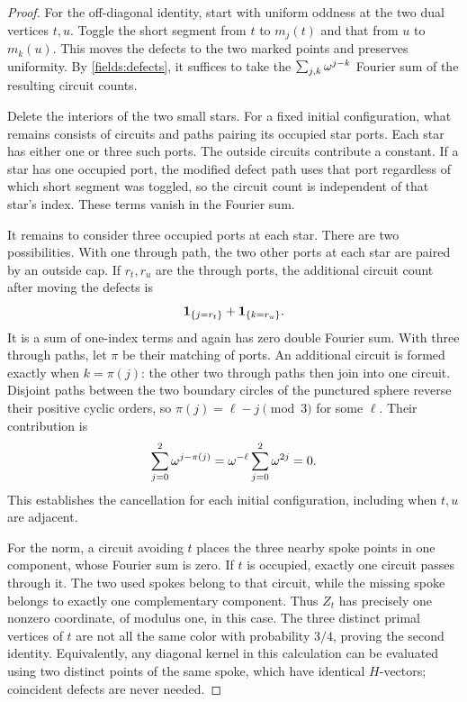 \begin{proof}
For the off-diagonal identity, start with uniform oddness at the two dual
vertices $t,u$.  Toggle the short segment from $t$ to $m_j(t)$ and that from
$u$ to $m_k(u)$.  This moves the defects to the two marked points and
preserves uniformity.  By \cref{fields:defects}, it suffices to take the
$\sum_{j,k}\omega^{j-k}$ Fourier sum of the resulting circuit counts.

Delete the interiors of the two small stars.  For a fixed initial
configuration, what remains consists of circuits and paths pairing its
occupied star ports.  Each star has either one or three such ports.  The
outside circuits contribute a constant.  If a star has one occupied port,
the modified defect path uses that port regardless of which short segment
was toggled, so the circuit count is independent of that star's index.
These terms vanish in the Fourier sum.

It remains to consider three occupied ports at each star.  There are two
possibilities.  With one through path, the two other ports at each star are
paired by an outside cap.  If $r_t,r_u$ are the through ports, the additional
circuit count after moving the defects is
\[
 \mathbf 1_{\{j=r_t\}}+\mathbf 1_{\{k=r_u\}}.
\]
It is a sum of one-index terms and again has zero double Fourier sum.  With
three through paths, let $\pi$ be their matching of ports.  An additional
circuit is formed exactly when $k=\pi(j)$: the other two through paths then
join into one circuit.  Disjoint paths between the two boundary circles of
the punctured sphere reverse their positive cyclic orders, so
$\pi(j)=\ell-j\pmod 3$ for some $\ell$.  Their contribution is
\[
 \sum_{j=0}^2\omega^{j-\pi(j)}
   =\omega^{-\ell}\sum_{j=0}^2\omega^{2j}=0.
\]
This establishes the cancellation for each initial configuration, including
when $t,u$ are adjacent.

For the norm, a circuit avoiding $t$ places the three nearby spoke points in
one component, whose Fourier sum is zero.  If $t$ is occupied, exactly one
circuit passes through it.  The two used spokes belong to that circuit,
while the missing spoke belongs to exactly one complementary component.
Thus $Z_t$ has precisely one nonzero coordinate, of modulus one, in this
case.  The three distinct primal vertices of $t$ are not all the same color
with probability $3/4$, proving the second identity.  Equivalently, any
diagonal kernel in this calculation can be evaluated using two distinct
points of the same spoke, which have identical $H$-vectors; coincident
defects are never needed.
\end{proof}

